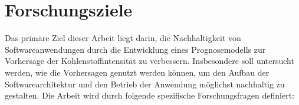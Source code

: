 %


\section{Forschungsziele}
Das primäre Ziel dieser Arbeit liegt darin, die Nachhaltigkeit von Softwareanwendungen durch die Entwicklung eines Prognosemodells zur Vorhersage der Kohlenstoffintensität zu verbessern.
Insbesondere soll untersucht werden, wie die Vorhersagen genutzt werden können, um den Aufbau der Softwarearchitektur und den Betrieb der Anwendung möglichst nachhaltig zu gestalten.
Die Arbeit wird durch folgende spezifische Forschungsfragen definiert:

